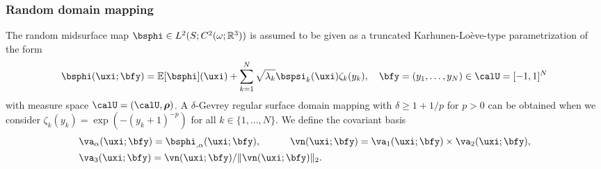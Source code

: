 \subsubsection{Random domain mapping}
The random midsurface map $\bsphi \in L^2(S;C^2(\omega;\mathbb{R}^3))$ is assumed to be given as a truncated Karhunen-Lo\`eve-type parametrization of the form
\begin{align}\label{eq:KLphi}
\bsphi(\uxi;\bfy) = \mathbb{E}[\bsphi](\uxi) + \sum_{k=1}^N \sqrt{\lambda_k} \bspsi_k(\uxi)\zeta_k(y_k), \quad \bfy = (y_1,\ldots, y_N) \in \calU = [-1,1]^N
\end{align} 
with measure space $\calU = (\calU,\boldsymbol{\rho})$. 
A $\delta$-Gevrey regular surface domain mapping with $\delta \geq 1 + 1/p$ for $p > 0$ can be obtained when we consider $\zeta_k(y_k) = \exp(- (y_k+1)^{-p})$ for all $k \in \{1, \ldots,N\}$.
We define the covariant basis
   \begin{align*}
       & \va_{\alpha}(\uxi;\bfy) = \bsphi_{,\alpha}(\uxi;\bfy), \quad \quad \quad  \vn(\uxi;\bfy) = \va_1(\uxi;\bfy) \times \va_2(\uxi;\bfy), \\
       &\va_{3}(\uxi;\bfy) =  \vn(\uxi;\bfy) / \| \vn (\uxi;\bfy) \|_2.
\end{align*}%


